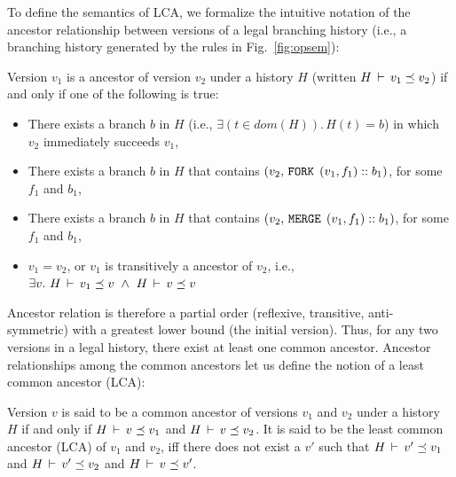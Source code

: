 To define the semantics of LCA, we formalize the intuitive notation of
the ancestor relationship between versions of a legal branching
history (i.e., a branching history generated by the rules in
Fig.~\ref{fig:opsem}):

\begin{definition} 
Version $v_1$ is a ancestor of version $v_2$ under a history
$H$ (written $H\,\vdash\,v_1 \preceq v_2$) if and only if one of the
following is true:
\begin{itemize}
  \item There exists a branch $b$ in $H$ (i.e., $\exists(t\in
  dom(H)).\,H(t) = b$) in which $v_2$ immediately succeeds
  $v_1$,
  \item There exists a branch $b$ in $H$ that contains $(v_2, 
  \,{\tt FORK}\,\; (v_1,f_1)::b_1)$, for some $f_1$ and $b_1$,
  \item There exists a branch $b$ in $H$ that contains
  $(v_2, \,{\tt MERGE}\,\;(v_1,f_1)::b_1)$, for some $f_1$ and $b_1$,
  \item $v_1 = v_2$, or $v_1$ is transitively a ancestor of
  $v_2$, i.e., $\exists v.~ H\,\vdash\,v_1 \preceq v ~\wedge~
  H\,\vdash\,v \preceq v$ 
\end{itemize}
\end{definition}

Ancestor relation is therefore a partial order (reflexive, transitive,
anti-symmetric) with a greatest lower bound (the initial version).
Thus, for any two versions in a legal history, there exist at least
one common ancestor. Ancestor relationships among the common ancestors
let us define the notion of a least common ancestor (LCA):

\begin{definition} 
Version $v$ is said to be a common ancestor of versions $v_1$ and
$v_2$ under a history $H$ if and only if $H\,\vdash\,v \preceq v_1$
and $H\,\vdash\,v \preceq v_2$. It is said to be the least common
ancestor (LCA) of $v_1$ and $v_2$, iff there does not exist a $v'$
such that $H\,\vdash\,v' \preceq v_1$ and $H\,\vdash\,v' \preceq v_2$
and $H\,\vdash\,v \preceq v'$.
\end{definition}

